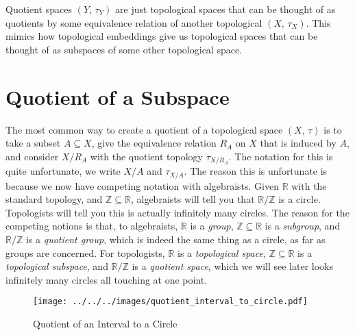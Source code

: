 \documentclass{article}
\theoremstyle{plain}
\theoremstyle{normal}
\begin{document}
        Quotient spaces $(Y,\,\tau_{Y})$ are just topological spaces that can
        be thought of as quotients by some equivalence relation of another
        topological $(X,\,\tau_{X})$. This mimics how topological embeddings
        give us topological spaces that can be thought of as subspaces of some
        other topological space.
    \section{Quotient of a Subspace}
        The most common way to create a quotient of a topological space
        $(X,\,\tau)$ is to take a subset $A\subseteq{X}$, give the equivalence
        relation $R_{A}$ on $X$ that is induced by $A$, and consider
        $X/R_{A}$ with the quotient topology $\tau_{X/R_{A}}$. The notation for
        this is quite unfortunate, we write $X/A$ and $\tau_{X/A}$. The reason
        this is unfortunate is because we now have competing notation with
        algebraists. Given $\mathbb{R}$ with the standard topology, and
        $\mathbb{Z}\subseteq\mathbb{R}$, algebraists will tell you that
        $\mathbb{R}/\mathbb{Z}$ is a circle. Topologists will tell you this is
        actually infinitely many circles. The reason for the competing notions
        is that, to algebraists, $\mathbb{R}$ is a \textit{group},
        $\mathbb{Z}\subseteq\mathbb{R}$ is a \textit{subgroup}, and
        $\mathbb{R}/\mathbb{Z}$ is a \textit{quotient group}, which is indeed
        the same thing as a circle, as far as groups are concerned. For
        topologists, $\mathbb{R}$ is a \textit{topological space},
        $\mathbb{Z}\subseteq\mathbb{R}$ is a \textit{topological subspace},
        and $\mathbb{R}/\mathbb{Z}$ is a \textit{quotient space}, which we will
        see later looks infinitely many circles all touching at one point.
        \begin{figure}
            \centering
            \texttt{[image: ../../../images/quotient\_interval\_to\_circle.pdf]}
            \caption{Quotient of an Interval to a Circle}
            \label{fig:quotient_interval_to_circle}
        \end{figure}
\end{document}
